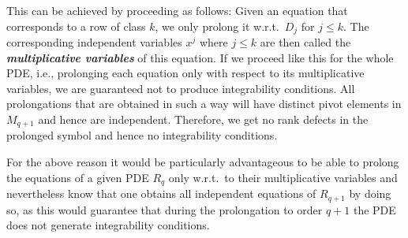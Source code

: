 This can be achieved by proceeding as follows:
Given an equation that corresponds to a row of class $k$, we only prolong it w.r.t.\ $D_j$ for  $j \leq k$. The corresponding independent variables $x^j$ where $j \leq k$ are then called the \textbf{\textit{multiplicative variables}} of this equation. If we proceed like this for the whole PDE, i.e., prolonging each equation only with respect to its multiplicative variables, we are guaranteed not to produce integrability conditions. All prolongations that are obtained in such a way will have distinct pivot elements in $M_{q+1}$ and hence are independent. Therefore, we get no rank defects in the prolonged symbol and hence no integrability conditions.

For the above reason it would be particularly advantageous to be able to prolong the equations of a given PDE $R_q$ only w.r.t.\ to their multiplicative variables and nevertheless know that one obtains all independent equations of $R_{q+1}$ by doing so, as this would  guarantee that during the prolongation to order $q+1$ the PDE does not generate integrability conditions.

